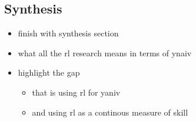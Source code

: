 \documentclass[../main.tex]{subfiles}
\begin{document}

\subsection{Synthesis}
\begin{itemize}
    \item finish with synthesis section
    \item what all the rl research means in terms of ynaiv
    \item highlight the gap
    \begin{itemize}
        \item that is using rl for yaniv
        \item and using rl as a continous measure of skill
    \end{itemize}
\end{itemize}
\end{document}
